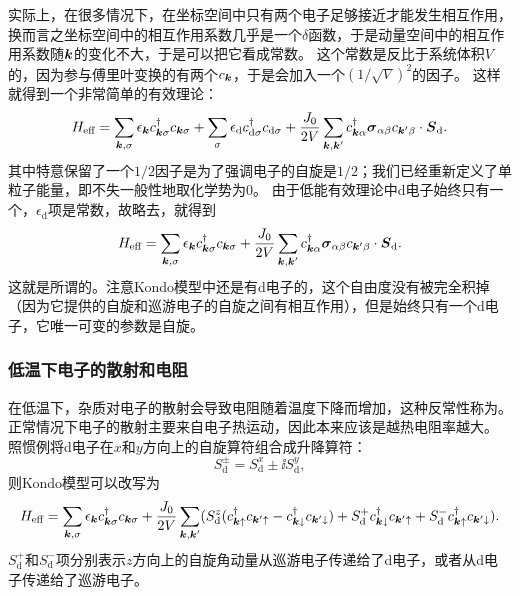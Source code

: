 实际上，在很多情况下，在坐标空间中只有两个电子足够接近才能发生相互作用，换而言之坐标空间中的相互作用系数几乎是一个$\delta$函数，于是动量空间中的相互作用系数随$\vb*{k}$的变化不大，于是可以把它看成常数。
这个常数是反比于系统体积$V$的，因为参与傅里叶变换的有两个${c}_{\vb*{k}}$，于是会加入一个$(1/\sqrt{V})^2$的因子。
这样就得到一个非常简单的有效理论：
\[
    {H}_\text{eff} = \sum_{\vb*{k}, \sigma} \epsilon_{\vb*{k}} {c}_{\vb*{k}\sigma}^\dagger {c}_{\vb*{k} \sigma} + \sum_\sigma \epsilon_\text{d} {c}_{\text{d}\sigma}^\dagger {c}_{\text{d} \sigma} + \frac{J_0}{2V} \sum_{\vb*{k}, \vb*{k}'} {c}^\dagger_{\vb*{k} \alpha} \vb*{\sigma}_{\alpha \beta} {c}_{\vb*{k}' \beta} \cdot {\vb*{S}}_\text{d}.
\]
其中特意保留了一个$1/2$因子是为了强调电子的自旋是$1/2$；我们已经重新定义了单粒子能量，即不失一般性地取化学势为$0$。%
由于低能有效理论中d电子始终只有一个，$\epsilon_\text{d}$项是常数，故略去，就得到
\begin{equation}
    {H}_\text{eff} = \sum_{\vb*{k}, \sigma} \epsilon_{\vb*{k}} {c}_{\vb*{k}\sigma}^\dagger {c}_{\vb*{k} \sigma} + \frac{J_0}{2V} \sum_{\vb*{k}, \vb*{k}'} {c}^\dagger_{\vb*{k} \alpha} \vb*{\sigma}_{\alpha \beta} {c}_{\vb*{k}' \beta} \cdot {\vb*{S}_\text{d}}.
\end{equation}
这就是所谓的。注意Kondo模型中还是有d电子的，这个自由度没有被完全积掉（因为它提供的自旋和巡游电子的自旋之间有相互作用），但是始终只有一个d电子，它唯一可变的参数是自旋。

\subsubsection{低温下电子的散射和电阻}

在低温下，杂质对电子的散射会导致电阻随着温度下降而增加，这种反常性称为。正常情况下电子的散射主要来自电子热运动，因此本来应该是越热电阻率越大。
照惯例将d电子在$x$和$y$方向上的自旋算符组合成升降算符：
\begin{equation}
    {S}_\text{d}^{\pm} = {S}_\text{d}^x \pm \ii {S}_\text{d}^y,
\end{equation}
则Kondo模型可以改写为
\begin{equation}
    {H}_\text{eff} = \sum_{\vb*{k}, \sigma} \epsilon_{\vb*{k}} {c}^\dagger_{\vb*{k} \sigma} {c}_{\vb*{k} \sigma} + \frac{J_0}{2V} \sum_{\vb*{k}, \vb*{k}'} (
        {S}_\text{d}^z ({c}^\dagger_{\vb*{k} \uparrow} {c}_{\vb*{k}' \uparrow} - {c}^\dagger_{\vb*{k} \downarrow} {c}_{\vb*{k}' \downarrow})
        + {S}^+_\text{d} {c}^\dagger_{\vb*{k} \downarrow} {c}_{\vb*{k}' \uparrow}
        + {S}^-_\text{d} {c}^\dagger_{\vb*{k} \uparrow} {c}_{\vb*{k}' \downarrow}
    ).
    \label{eq:kondo-spin-up-down}
\end{equation}
${S}^+_\text{d}$和${S}^-_\text{d}$项分别表示$z$方向上的自旋角动量从巡游电子传递给了d电子，或者从d电子传递给了巡游电子。

